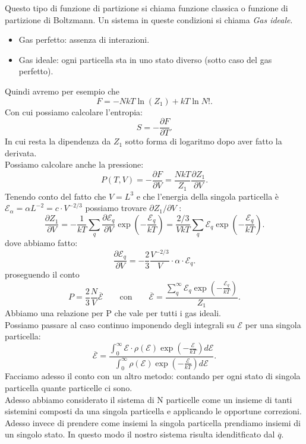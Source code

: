Questo tipo di funzione di partizione si chiama funzione classica o funzione di partizione di Boltzmann. Un sistema in queste condizioni si chiama \textit{Gas ideale}.
\begin{itemize}
	\item Gas perfetto: assenza di interazioni.
	\item Gas ideale: ogni particella sta in uno stato diverso (sotto caso del gas perfetto).
\end{itemize} \label{def:gas-ideale}
Quindi avremo per esempio che
\[
	F = -NkT \ln \left( Z_1 \right) + kT \ln N!
.\] 
Con cui possiamo calcolare l'entropia:
\[
	S = - \frac{\partial F}{\partial T} 
.\] 
In cui resta la dipendenza da $Z_1$ sotto forma di logaritmo dopo aver fatto la derivata.\\
Possiamo calcolare anche la pressione:
\[
	P\left( T,V \right) = - \frac{\partial F}{\partial V} = \frac{NkT}{Z_1} \frac{\partial Z_1}{\partial V} 
.\] 
Tenendo conto del fatto che $V = L^3$ e che l'energia della singola particella è $\mathcal{E}_{\alpha}= \alpha L^{-2} = c \cdot V^{-2 /3}$ possiamo trovare $\partial Z_1 /\partial V $ :
\[
	\frac{\partial Z_1}{\partial V}  = - \frac{1}{kT}\sum_{q}^{} \frac{\partial \mathcal{E}_{q}}{\partial V} \exp\left( - \frac{\mathcal{E}_{q}}{kT} \right) = 
	\frac{2 /3}{VkT} \sum_{q}^{} \mathcal{E}_{q}\exp\left( -\frac{\mathcal{E}_{q}}{kT} \right) 
.\] 
dove abbiamo fatto:
\[
	\frac{\partial \mathcal{E}_{q}}{\partial V} = -\frac{2}{3}\frac{V^{-2 /3}}{V}\cdot \alpha\cdot  \mathcal{E}_{q}
.\] 
proseguendo il conto
\[
	P = \frac{2}{3}\frac{N}{V}\overline{\mathcal{E}} \quad \quad \text{con} \quad \quad \overline{\mathcal{E}} = \frac{\sum_{q}^{\infty} \mathcal{E}_{q}\exp\left( - \frac{\mathcal{E}_{q}}{kT} \right) }{Z_1}
.\] 
Abbiamo una relazione per P che vale per tutti i gas ideali.\\
Possiamo passare al caso continuo  imponendo degli integrali su $\mathcal{E}$ per una singola particella:
\[
	\overline{\mathcal{E}} = \frac{\int_{0}^{\infty} \mathcal{E}\cdot  \rho\left( \mathcal{E} \right) \exp\left( -\frac{\mathcal{E}}{kT} \right) d\mathcal{E}}{\int_{0}^{\infty}\rho\left( \mathcal{E} \right) \exp \left( -\frac{\mathcal{E}}{kT} \right) d\mathcal{E}}
.\] 
Facciamo adesso il conto con un altro metodo: contando per ogni stato di singola particella quante particelle ci sono.\\
Adesso abbiamo considerato il sistema di N particelle come un insieme di tanti sistemini composti da una singola particella e applicando le opportune correzioni. Adesso invece di prendere come insiemi la singola particella prendiamo insiemi di un singolo stato. In questo modo il nostro sistema risulta idenditficato dal $\overline{q}$.\\
